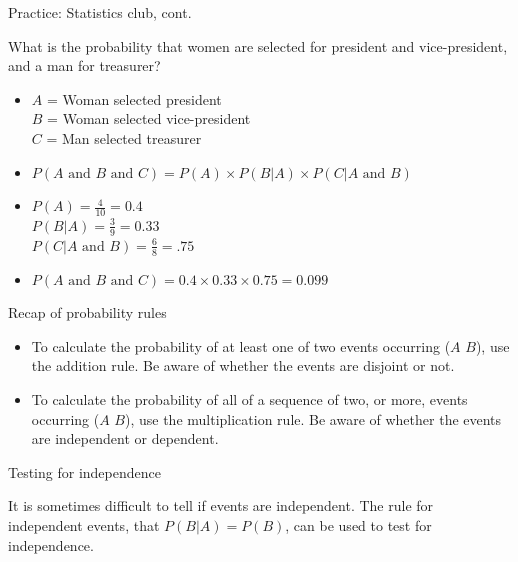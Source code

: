 \documentclass[xcolor=table, aspectratio=169, bigger]{beamer}
\begin{document}
\begin{frame}{Practice: Statistics club, cont.}
\begin{exampleblock}{}
What is the probability that women are selected for president and vice-president, and a man for treasurer?
\begin{itemize}
\pause
\item $A$ = Woman selected president\\
$B$ = Woman selected vice-president\\
$C$ = Man selected treasurer
\pause
\item $P(A \text{ and } B \text{ and } C) = P(A) \times P(B|A) \times P(C | A \text{ and } B)$\\
\pause
\item $P(A) = \frac 4{10} = 0.4$\\
$P(B|A) = \frac 3 9 = 0.33$\\
$P(C | A \text{ and } B) = \frac 6 8 = .75$

\pause
\item $P(A \text{ and } B \text{ and } C) = 0.4 \times 0.33 \times 0.75 = 0.099$ 
\end{itemize}
\end{exampleblock}
\end{frame}

\begin{frame}{Recap of probability rules}
\begin{block}{}
\begin{itemize}
\item To calculate the probability of at least one of two events occurring ($A$  $B$), use the addition rule. Be aware of whether the events are disjoint or not.

\pause
\item To calculate  the probability of all of a sequence of two, or more, events occurring ($A$  $B$), use the multiplication rule. Be aware of whether the events are independent or dependent.
\end{itemize}
\end{block}
\end{frame}

\begin{frame}{Testing for independence}
\begin{block}{}
It is sometimes difficult to tell if events are independent. The rule for independent events, that $P(B|A) = P(B)$, can be used to test for independence.
\end{block}
\end{frame}
\end{document}
